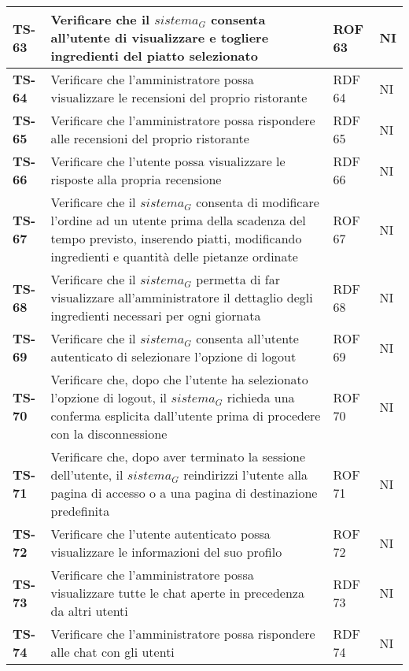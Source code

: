 \begin{longtable}{|>{\centering\arraybackslash}p{1.5cm}|p{12cm}|p{2cm}|p{1cm}|}
  \hline
  \rowcolor{gray!10}
  \textbf{TS-63} & Verificare che il $\textit{sistema}_G$ consenta all'utente di visualizzare e togliere ingredienti del piatto selezionato & ROF 63 & NI \\
  \hline
  \rowcolor{gray!10}
  \textbf{TS-64} & Verificare che l'amministratore possa visualizzare le recensioni del proprio ristorante & RDF 64 & NI \\ 
  \hline
  \rowcolor{gray!10}
  \textbf{TS-65} & Verificare che l'amministratore possa rispondere alle recensioni del proprio ristorante & RDF 65 & NI \\ 
  \hline
  \rowcolor{gray!10}
  \textbf{TS-66} & Verificare che l'utente possa visualizzare le risposte alla propria recensione & RDF 66 & NI \\
  \hline
  \rowcolor{gray!10}
  \textbf{TS-67} & Verificare che il $\textit{sistema}_G$ consenta di modificare l'ordine ad un utente prima della scadenza del tempo previsto, inserendo piatti, modificando ingredienti e quantità delle pietanze ordinate & ROF 67 & NI \\ 
  \hline
  \rowcolor{gray!10}
  \textbf{TS-68} & Verificare che il $\textit{sistema}_G$ permetta di far visualizzare all'amministratore il dettaglio degli ingredienti necessari per ogni giornata & RDF 68 & NI \\ 
  \hline
  \rowcolor{gray!10}
  \textbf{TS-69} & Verificare che il $\textit{sistema}_G$ consenta all'utente autenticato di selezionare l'opzione di logout & ROF 69 & NI \\
  \hline
  \rowcolor{gray!10}
  \textbf{TS-70} & Verificare che, dopo che l'utente ha selezionato l'opzione di logout, il $\textit{sistema}_G$ richieda una conferma esplicita dall'utente prima di procedere con la disconnessione & ROF 70 & NI \\ 
  \hline
  \rowcolor{gray!10}
  \textbf{TS-71} & Verificare che, dopo aver terminato la sessione dell'utente, il $\textit{sistema}_G$ reindirizzi l'utente alla pagina di accesso o a una pagina di destinazione predefinita & ROF 71 & NI \\ 
  \hline
  \rowcolor{gray!10}
  \textbf{TS-72} & Verificare che l'utente autenticato possa visualizzare le informazioni del suo profilo & ROF 72 & NI \\ 
  \hline
  \rowcolor{gray!10}
  \textbf{TS-73} & Verificare che l'amministratore possa visualizzare tutte le chat aperte in precedenza da altri utenti& RDF 73 & NI \\ 
  \hline
  \rowcolor{gray!10}
  \textbf{TS-74} & Verificare che l'amministratore possa rispondere alle chat con gli utenti & RDF 74 & NI \\ 

\end{longtable}
